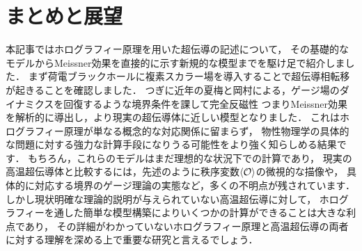 \documentclass[b5paper,11pt,dvipdfmx]{jsarticle}
\numberwithin{equation}{section}
\theoremstyle{definition}
\begin{document}
\section{まとめと展望}
本記事ではホログラフィー原理を用いた超伝導の記述について，
その基礎的なモデルからMeissner効果を直接的に示す新規的な模型までを駆け足で紹介しました．
まず荷電ブラックホールに複素スカラー場を導入することで超伝導相転移が起きることを確認しました．
つぎに近年の夏梅と岡村による，ゲージ場のダイナミクスを回復するような境界条件を課して完全反磁性
つまりMeissner効果を解析的に導出し，より現実の超伝導体に近しい模型となりました．
これはホログラフィー原理が単なる概念的な対応関係に留まらず，
物性物理学の具体的な問題に対する強力な計算手段になりうる可能性をより強く知らしめる結果です．
もちろん，これらのモデルはまだ理想的な状況下での計算であり，
現実の高温超伝導体と比較するには，先述のように秩序変数$\ev{\mathcal{O}}$の微視的な描像や，
具体的に対応する境界のゲージ理論の実態など，多くの不明点が残されています．
しかし現状明確な理論的説明が与えられていない高温超伝導に対して，
ホログラフィーを通した簡単な模型構築によりいくつかの計算ができることは大きな利点であり，
その詳細がわかっていないホログラフィー原理と高温超伝導の両者に対する理解を深める上で重要な研究と言えるでしょう．
\end{document}
